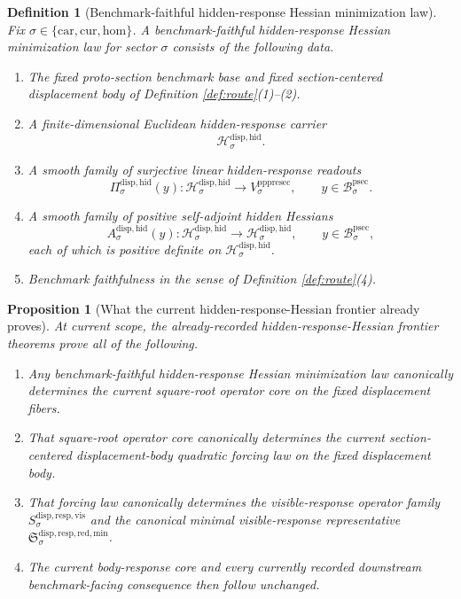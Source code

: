 \documentclass[11pt]{article}
\newcommand{\Car}{\mathrm{car}}
\newcommand{\Cur}{\mathrm{cur}}
\newcommand{\Hom}{\mathrm{hom}}
\newcommand{\ProtoSectionBody}[1]{\mathcal B_{#1}^{\mathrm{psec}}}
\newcommand{\PrePreProtoSectionVertical}[1]{V_{#1}^{\mathrm{pppresec}}}
\newcommand{\VisibleResponseOperator}[1]{S_{#1}^{\mathrm{disp,resp,vis}}}
\newcommand{\MinimalReducedStructure}{\mathfrak S^{\mathrm{disp,resp,red,min}}}
\newcommand{\HiddenCarrier}[1]{\mathcal H_{#1}^{\mathrm{disp,hid}}}
\newcommand{\HiddenReadout}[1]{\Pi_{#1}^{\mathrm{disp,hid}}}
\newcommand{\HiddenHessian}[1]{A_{#1}^{\mathrm{disp,hid}}}
\newtheorem{definition}{Definition}
\newtheorem{proposition}{Proposition}
\begin{document}
\begin{definition}[Benchmark-faithful hidden-response Hessian minimization law]
\label{def:hidden}
Fix \(\sigma\in\{\Car,\Cur,\Hom\}\). A \emph{benchmark-faithful hidden-response Hessian minimization law} for sector \(\sigma\) consists of the following data.
\begin{enumerate}
    \item The fixed proto-section benchmark base and fixed section-centered displacement body of Definition \ref{def:route}(1)--(2).
    \item A finite-dimensional Euclidean hidden-response carrier
    \[
    \HiddenCarrier{\sigma}.
    \]
    \item A smooth family of surjective linear hidden-response readouts
    \[
    \HiddenReadout{\sigma}(y):
    \HiddenCarrier{\sigma}\to\PrePreProtoSectionVertical{\sigma},
    \qquad
    y\in\ProtoSectionBody{\sigma}.
    \]
    \item A smooth family of positive self-adjoint hidden Hessians
    \[
    \HiddenHessian{\sigma}(y):
    \HiddenCarrier{\sigma}\to\HiddenCarrier{\sigma},
    \qquad
    y\in\ProtoSectionBody{\sigma},
    \]
    each of which is positive definite on \(\HiddenCarrier{\sigma}\).
    \item Benchmark faithfulness in the sense of Definition \ref{def:route}(4).
\end{enumerate}
\end{definition}

\begin{proposition}[What the current hidden-response-Hessian frontier already proves]
\label{prop:frontier}
At current scope, the already-recorded hidden-response-Hessian frontier theorems prove all of the following.
\begin{enumerate}
    \item Any benchmark-faithful hidden-response Hessian minimization law canonically determines the current square-root operator core on the fixed displacement fibers.
    \item That square-root operator core canonically determines the current section-centered displacement-body quadratic forcing law on the fixed displacement body.
    \item That forcing law canonically determines the visible-response operator family \(\VisibleResponseOperator{\sigma}\) and the canonical minimal visible-response representative \(\MinimalReducedStructure_{\sigma}\).
    \item The current body-response core and every currently recorded downstream benchmark-facing consequence then follow unchanged.
\end{enumerate}
\end{proposition}
\end{document}
